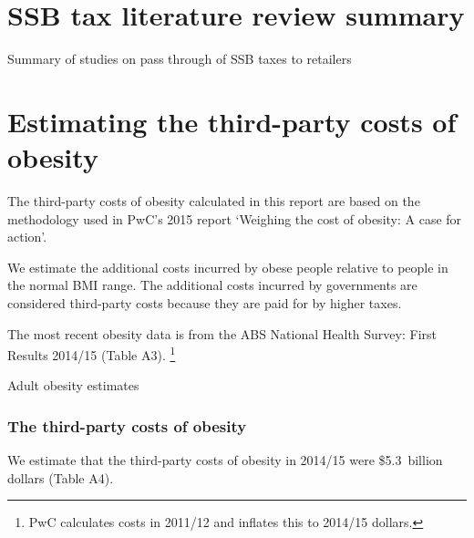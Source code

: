 \documentclass[embargoed]{grattan}
\begin{document}
\appendix

\onecolumn
\chapter{SSB tax literature review summary}\label{appendix-1-ssb-tax-literature-review-summary}




\begin{table}[t]
\caption{Summary of studies on pass through of SSB taxes to retailers}



\end{table}
\twocolumn

\chapter{Estimating the third-party costs of obesity }\label{appendix-2-estimating-the-third-party-costs-of-obesity}

The third-party costs of obesity calculated in this report are based on the methodology used in PwC's 2015 report `Weighing the cost of obesity: A case for action'.

We estimate the additional costs incurred by obese people relative to people in the normal BMI range.
The additional costs incurred by governments are considered third-party costs because they are paid for by higher taxes.

The most recent obesity data is from the ABS National Health Survey: First Results 2014/15 (Table A3).%
\footnote{PwC calculates costs in 2011/12 and inflates this to 2014/15 dollars.}

\begin{table}
\caption{Adult obesity estimates}



\end{table}

\subsection{The third-party costs of obesity}\label{the-third-party-costs-of-obesity}

We estimate that the third-party costs of obesity in 2014/15 were \$5.3~billion dollars (Table A4).
\end{document}
